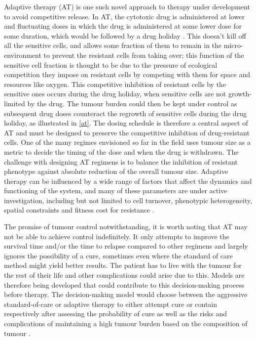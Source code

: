 Adaptive therapy (AT) is one such novel approach to therapy under development to avoid competitive release. In AT, the cytotoxic drug is administered at lower and fluctuating doses in which the drug is administered at some lower dose for some duration, which would be followed by a drug holiday \cite{Gatenby}. This doesn’t kill off all the sensitive cells, and allows some fraction of them to remain in the micro-environment to prevent the resistant cells from taking over; this function of the sensitive cell fraction is thought to be due to the pressure of ecological competition they impose on resistant cells by competing with them for space and resources like oxygen. This competitive inhibition of resistant cells by the sensitive ones occurs during the drug holiday, when sensitive cells are not growth-limited by the drug. The tumour burden could then be kept under control as subsequent drug doses counteract the regrowth of sensitive cells during the drug holiday, as illustrated in \autoref{at}. The dosing schedule is therefore a central aspect of AT and must be designed to preserve the competitive inhibition of drug-resistant cells. One of the many regimes envisioned so far in the field uses tumour size as a metric to decide the timing of the dose and when the drug is withdrawn. The challenge with designing AT regimens is to balance the inhibition of resistant phenotype against absolute reduction of the overall tumour size. Adaptive therapy can be influenced by a wide range of factors that affect the dynamics and functioning of the system, and many of these parameters are under active investigation, including but not limited to cell turnover,  phenotypic heterogeneity, spatial constraints and fitness cost for resistance \cite{Strobl,Gallaher,Viossat,Bacevic}.

The promise of tumour control notwithstanding, it is worth noting that AT may not be able to achieve control indefinitely. It only attempts to improve the survival time and/or the time to relapse compared to other regimens and largely ignores the possibility of a cure, sometimes even where the standard of care method might yield better results. The patient has to live with the tumour for the rest of their life and other complications could arise due to this. Models are therefore being developed that could contribute to this decision-making process before therapy. The decision-making model would choose between the aggressive standard-of-care or adaptive therapy to either attempt cure or contain respectively after assessing the probability of cure as well as the risks and complications of maintaining a high tumour burden based on the composition of tumour \cite{Hansen}.

